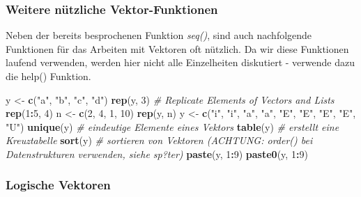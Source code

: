 \documentclass[]{article}
\newenvironment{Shaded}{\begin{snugshade}}{\end{snugshade}}
\newcommand{\KeywordTok}[1]{\textcolor[rgb]{0.13,0.29,0.53}{\textbf{#1}}}
\newcommand{\DecValTok}[1]{\textcolor[rgb]{0.00,0.00,0.81}{#1}}
\newcommand{\StringTok}[1]{\textcolor[rgb]{0.31,0.60,0.02}{#1}}
\newcommand{\CommentTok}[1]{\textcolor[rgb]{0.56,0.35,0.01}{\textit{#1}}}
\newcommand{\OperatorTok}[1]{\textcolor[rgb]{0.81,0.36,0.00}{\textbf{#1}}}
\newcommand{\NormalTok}[1]{#1}
\begin{document}
\subsubsection*{Weitere nützliche
Vektor-Funktionen}\label{weitere-nutzliche-vektor-funktionen}

Neben der bereits besprochenen Funktion \emph{seq()}, sind auch
nachfolgende Funktionen für das Arbeiten mit Vektoren oft nützlich. Da
wir diese Funktionen laufend verwenden, werden hier nicht alle
Einzelheiten diskutiert - verwende dazu die help() Funktion.

\begin{Shaded}
\begin{Highlighting}[]
\NormalTok{    y <-}\StringTok{ }\KeywordTok{c}\NormalTok{(}\StringTok{"a"}\NormalTok{, }\StringTok{"b"}\NormalTok{, }\StringTok{"c"}\NormalTok{, }\StringTok{"d"}\NormalTok{) }
    \KeywordTok{rep}\NormalTok{(y, }\DecValTok{3}\NormalTok{) }\CommentTok{# Replicate Elements of Vectors and Lists}
    \KeywordTok{rep}\NormalTok{(}\DecValTok{1}\OperatorTok{:}\DecValTok{5}\NormalTok{, }\DecValTok{4}\NormalTok{)}
\NormalTok{    n <-}\StringTok{ }\KeywordTok{c}\NormalTok{(}\DecValTok{2}\NormalTok{, }\DecValTok{4}\NormalTok{, }\DecValTok{1}\NormalTok{, }\DecValTok{10}\NormalTok{)}
    \KeywordTok{rep}\NormalTok{(y, n)}
\NormalTok{    y <-}\StringTok{ }\KeywordTok{c}\NormalTok{(}\StringTok{"i"}\NormalTok{, }\StringTok{"i"}\NormalTok{, }\StringTok{"a"}\NormalTok{, }\StringTok{"a"}\NormalTok{, }\StringTok{"E"}\NormalTok{, }\StringTok{"E"}\NormalTok{, }\StringTok{"E"}\NormalTok{, }\StringTok{"E"}\NormalTok{, }\StringTok{"U"}\NormalTok{)}
    \KeywordTok{unique}\NormalTok{(y) }\CommentTok{# eindeutige Elemente eines Vektors}
    \KeywordTok{table}\NormalTok{(y)  }\CommentTok{# erstellt eine Kreuztabelle}
    \KeywordTok{sort}\NormalTok{(y)   }\CommentTok{# sortieren von Vektoren (ACHTUNG: order() bei Datenstrukturen verwenden, siehe sp?ter)}
    \KeywordTok{paste}\NormalTok{(y, }\DecValTok{1}\OperatorTok{:}\DecValTok{9}\NormalTok{)}
    \KeywordTok{paste0}\NormalTok{(y, }\DecValTok{1}\OperatorTok{:}\DecValTok{9}\NormalTok{)}
\end{Highlighting}
\end{Shaded}

\subsubsection*{Logische Vektoren}\label{logische-vektoren}
\end{document}
